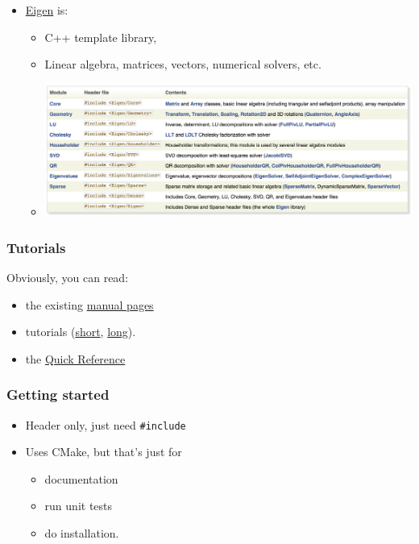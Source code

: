 \begin{itemize}
\itemsep1pt\parskip0pt
\item
  \href{http://eigen.tuxfamily.org}{Eigen} is:

  \begin{itemize}
  \itemsep1pt\parskip0pt
  \item
    C++ template library,
  \item
    Linear algebra, matrices, vectors, numerical solvers, etc.
  \item
    \includegraphics{03libraries/figures/eigenContents.png}
  \end{itemize}
\end{itemize}

\subsubsection{Tutorials}\label{tutorials}

Obviously, you can read:

\begin{itemize}
\itemsep1pt\parskip0pt
\item
  the existing \href{http://eigen.tuxfamily.org/dox/index.html}{manual
  pages}
\item
  tutorials
  (\href{http://eigen.tuxfamily.org/dox/GettingStarted.html}{short},
  \href{http://eigen.tuxfamily.org/dox/group__TutorialMatrixClass.html}{long}).
\item
  the
  \href{http://eigen.tuxfamily.org/dox/group__QuickRefPage.html}{Quick
  Reference}
\end{itemize}

\subsubsection{Getting started}\label{getting-started}

\begin{itemize}
\itemsep1pt\parskip0pt
\item
  Header only, just need \texttt{\#include}
\item
  Uses CMake, but that's just for

  \begin{itemize}
  \itemsep1pt\parskip0pt
  \item
    documentation
  \item
    run unit tests
  \item
    do installation.
  \end{itemize}
\end{itemize}

